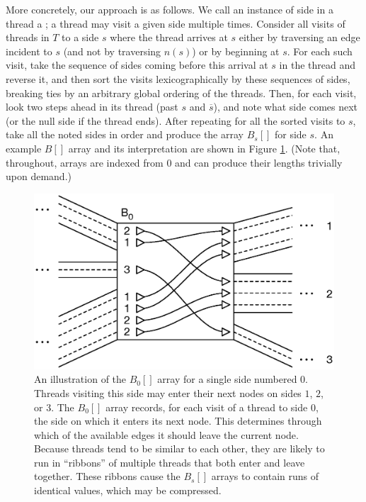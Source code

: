 More concretely, our approach is as follows. We call an instance of side in a thread a ; a thread may visit a given side multiple times. Consider all visits of threads in $T$ to a side $s$ where the thread arrives at $s$ either by traversing an edge incident to $s$ (and not by traversing $n(s)$) or by beginning at $s$. For each such visit, take the sequence of sides coming before this arrival at $s$ in the thread and reverse it, and then sort the visits lexicographically by these sequences of sides, breaking ties by an arbitrary global ordering of the threads. Then, for each visit, look two steps ahead in its thread (past $s$ and $\overline{s}$), and note what side comes next (or the null side if the thread ends). After repeating for all the sorted visits to $s$, take all the noted sides in order and produce the array $B_s[]$ for side $s$. An example $B[]$ array and its interpretation are shown in Figure \ref{fig:barray}. (Note that, throughout, arrays are indexed from $0$ and can produce their lengths trivially upon demand.)  

\begin{figure}[h!]
\centering
\includegraphics[width=\linewidth]{figures/03_gpbwt/barray.eps}
\caption{An illustration of the $B_{0}[]$ array for a single side numbered $0$. Threads visiting this side may enter their next nodes on sides $1$, $2$, or $3$. The $B_0[]$ array records, for each visit of a thread to side $0$, the side on which it enters its next node. This determines through which of the available edges it should leave the current node. Because threads tend to be similar to each other, they are likely to run in ``ribbons'' of multiple threads that both enter and leave together. These ribbons cause the $B_s[]$ arrays to contain runs of identical values, which may be compressed.}
\label{fig:barray}
\end{figure}

